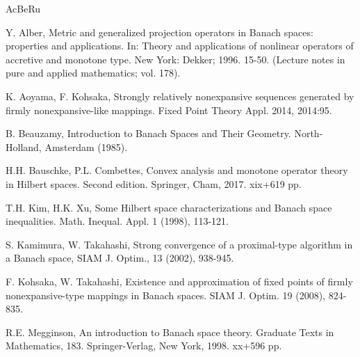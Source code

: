 \documentclass[12pt,a4paper]{amsart}
\theoremstyle{definition}
\numberwithin{equation}{section}
\begin{document}
\begin{thebibliography}{AcBeRu}

 Y. Alber, Metric and generalized projection operators in Banach spaces: properties and applications. In: Theory and applications of nonlinear operators of accretive and monotone type. New York: Dekker; 1996. 15-50. (Lecture notes in pure and applied mathematics; vol. 178).

 K. Aoyama, F. Kohsaka, Strongly relatively nonexpansive sequences generated by firmly nonexpansive-like mappings. Fixed Point Theory Appl. 2014, 2014:95.

 B. Beauzamy, Introduction to Banach Spaces and Their Geometry. North-Holland, Amsterdam (1985).
    
 H.H. Bauschke, P.L. Combettes, Convex analysis and monotone operator theory in Hilbert spaces. Second edition. Springer, Cham, 2017. xix+619 pp.

 T.H. Kim, H.K. Xu, Some Hilbert space characterizations and Banach space inequalities. Math. Inequal. Appl. 1 (1998), 113-121.

 S. Kamimura, W. Takahashi, Strong convergence of a proximal-type algorithm in a Banach space, SIAM J. Optim., 13 (2002), 938-945.

 F. Kohsaka, W. Takahashi, Existence and approximation of fixed points of firmly nonexpansive-type mappings in Banach spaces. SIAM J. Optim. 19 (2008), 824-835.

 R.E. Megginson, An introduction to Banach space theory. Graduate Texts in Mathematics, 183. Springer-Verlag, New York, 1998. xx+596 pp.
\end{thebibliography}
\end{document}
